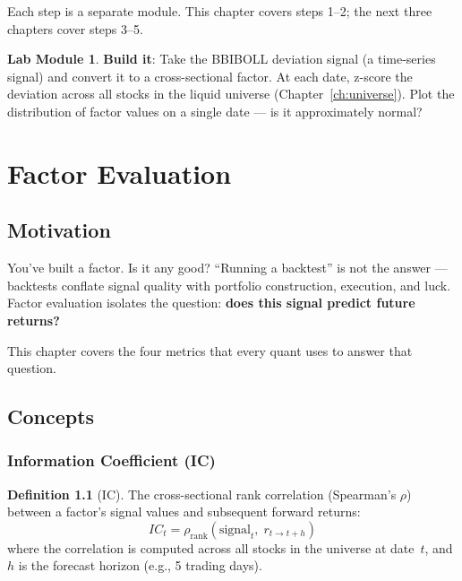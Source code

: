 \documentclass[a4paper, 11pt]{report}
\theoremstyle{definition}
\newtheorem{definition}{Definition}[chapter]
\newtheorem{labmod}{Lab Module}[chapter]
\theoremstyle{remark}
\begin{document}
Each step is a separate module.  This chapter covers steps 1--2; the next three
chapters cover steps 3--5.

\begin{labmod}
    \textbf{Build it}: Take the BBIBOLL deviation signal (a time-series signal)
    and convert it to a cross-sectional factor.  At each date, z-score the
    deviation across all stocks in the liquid universe (Chapter~\ref{ch:universe}).
    Plot the distribution of factor values on a single date --- is it
    approximately normal?
\end{labmod}


\chapter{Factor Evaluation}
\label{ch:factor-eval}

\section{Motivation}

You've built a factor.  Is it any good?  ``Running a backtest'' is not the
answer --- backtests conflate signal quality with portfolio construction,
execution, and luck.  Factor evaluation isolates the question: \textbf{does
this signal predict future returns?}

This chapter covers the four metrics that every quant uses to answer that
question.

\section{Concepts}

\subsection{Information Coefficient (IC)}

\begin{definition}[IC]
    The cross-sectional rank correlation (Spearman's $\rho$) between a factor's
    signal values and subsequent forward returns:
    \[
        IC_t = \rho_{\text{rank}}\!\left(\text{signal}_{t},\; r_{t \to t+h}\right)
    \]
    where the correlation is computed across all stocks in the universe at
    date~$t$, and $h$ is the forecast horizon (e.g., 5 trading days).
\end{definition}
\end{document}
